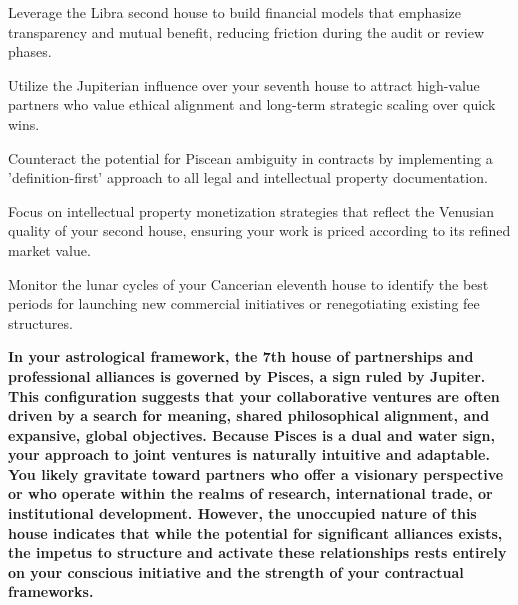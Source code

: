 \begin{diamondlist}
  \item {\fontsize{8.5}{12}\selectfont Leverage the Libra second house to build financial models that emphasize transparency and mutual benefit, reducing friction during the audit or review phases.}
  \item {\fontsize{8.5}{12}\selectfont Utilize the Jupiterian influence over your seventh house to attract high-value partners who value ethical alignment and long-term strategic scaling over quick wins.}
  \item {\fontsize{8.5}{12}\selectfont Counteract the potential for Piscean ambiguity in contracts by implementing a 'definition-first' approach to all legal and intellectual property documentation.}
  \item {\fontsize{8.5}{12}\selectfont Focus on intellectual property monetization strategies that reflect the Venusian quality of your second house, ensuring your work is priced according to its refined market value.}
  \item {\fontsize{8.5}{12}\selectfont Monitor the lunar cycles of your Cancerian eleventh house to identify the best periods for launching new commercial initiatives or renegotiating existing fee structures.}
\end{diamondlist}


\label{topic51}

{\fontsize{9.5}{13.8}\selectfont\bfseries\color{DeepSlate} In your astrological framework, the 7th house of partnerships and professional alliances is governed by Pisces, a sign ruled by Jupiter. This configuration suggests that your collaborative ventures are often driven by a search for meaning, shared philosophical alignment, and expansive, global objectives. Because Pisces is a dual and water sign, your approach to joint ventures is naturally intuitive and adaptable. You likely gravitate toward partners who offer a visionary perspective or who operate within the realms of research, international trade, or institutional development. However, the unoccupied nature of this house indicates that while the potential for significant alliances exists, the impetus to structure and activate these relationships rests entirely on your conscious initiative and the strength of your contractual frameworks.}\par\vspace{2mm}

